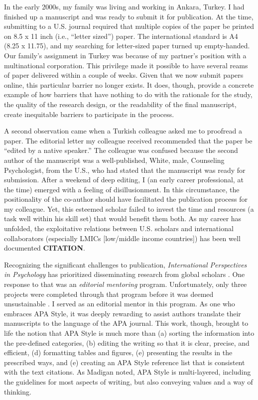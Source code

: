 \documentclass[
  11pt,
]{book}
\begin{document}
In the early 2000s, my family was living and working in Ankara, Turkey. I had finished up a manuscript and was ready to submit it for publication. At the time, submitting to a U.S. journal required that multiple copies of the paper be printed on 8.5 x 11 inch (i.e., ``letter sized'') paper. The international standard is A4 (8.25 x 11.75), and my searching for letter-sized paper turned up empty-handed. Our family's assignment in Turkey was because of my partner's position with a multinational corporation. This privilege made it possible to have several reams of paper delivered within a couple of weeks. Given that we now submit papers online, this particular barrier no longer exists. It does, though, provide a concrete example of how barriers that have nothing to do with the rationale for the study, the quality of the research design, or the readability of the final manuscript, create inequitable barriers to participate in the process.

A second observation came when a Turkish colleague asked me to proofread a paper. The editorial letter my colleague received recommended that the paper be ``edited by a native speaker.'' The colleague was confused because the second author of the manuscript was a well-published, White, male, Counseling Psychologist, from the U.S., who had stated that the manuscript was ready for submission. After a weekend of deep editing, I (an early career professional, at the time) emerged with a feeling of disillusionment. In this circumstance, the positionality of the co-author should have facilitated the publication process for my colleague. Yet, this esteemed scholar failed to invest the time and resources (a task well within his skill set) that would benefit them both. As my career has unfolded, the exploitative relations between U.S. scholars and international collaborators (especially LMICs {[}low/middle income countries{]}) has been well documented \textbf{CITATION}.

Recognizing the significant challenges to publication, \emph{International Perspectives in Psychology} has prioritized disseminating research from global scholars \citep{gibbons_inaugural_2012}. One response to that was an \emph{editorial mentoring} program. Unfortunately, only three projects were completed through that program before it was deemed unsustainable \citep{gibbons_ippquo_2016}. I served as an editorial mentor in this program. As one who embraces APA Style, it was deeply rewarding to assist authors translate their manuscripts to the language of the APA journal. This work, though, brought to life the notion that APA Style is much more than (a) sorting the information into the pre-defined categories, (b) editing the writing so that it is clear, precise, and efficient, (d) formatting tables and figures, (e) presenting the results in the prescribed ways, and (e) creating an APA Style reference list that is consistent with the text citations. As Madigan \citeyearpar{madigan_language_1995} noted, APA Style is multi-layered, including the guidelines for most aspects of writing, but also conveying values and a way of thinking.
\end{document}
